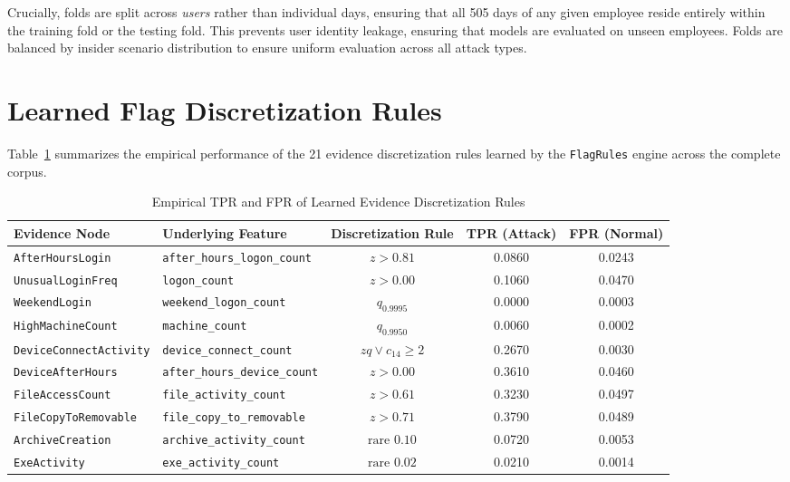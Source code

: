 \documentclass[12pt,a4paper]{report}
\begin{document}
Crucially, folds are split across \textit{users} rather than individual days, ensuring that all 505 days of any given employee reside entirely within the training fold or the testing fold. This prevents user identity leakage, ensuring that models are evaluated on unseen employees. Folds are balanced by insider scenario distribution to ensure uniform evaluation across all attack types.

\section{Learned Flag Discretization Rules}
Table~\ref{tab:results_flag_rules} summarizes the empirical performance of the 21 evidence discretization rules learned by the \texttt{FlagRules} engine across the complete corpus.

\begin{table}[H]
\centering
\caption{Empirical TPR and FPR of Learned Evidence Discretization Rules}
\label{tab:results_flag_rules}
\fontsize{9}{11}\selectfont
\begin{tabular}{llccc}
\toprule
\textbf{Evidence Node} & \textbf{Underlying Feature} & \textbf{Discretization Rule} & \textbf{TPR (Attack)} & \textbf{FPR (Normal)} \\
\midrule
\texttt{AfterHoursLogin} & \texttt{after\_hours\_logon\_count} & $z > 0.81$ & 0.0860 & 0.0243 \\
\texttt{UnusualLoginFreq} & \texttt{logon\_count} & $z > 0.00$ & 0.1060 & 0.0470 \\
\texttt{WeekendLogin} & \texttt{weekend\_logon\_count} & $q_{0.9995}$ & 0.0000 & 0.0003 \\
\texttt{HighMachineCount} & \texttt{machine\_count} & $q_{0.9950}$ & 0.0060 & 0.0002 \\
\texttt{DeviceConnectActivity} & \texttt{device\_connect\_count} & $zq \lor c_{14} \ge 2$ & 0.2670 & 0.0030 \\
\texttt{DeviceAfterHours} & \texttt{after\_hours\_device\_count} & $z > 0.00$ & 0.3610 & 0.0460 \\
\texttt{FileAccessCount} & \texttt{file\_activity\_count} & $z > 0.61$ & 0.3230 & 0.0497 \\
\texttt{FileCopyToRemovable} & \texttt{file\_copy\_to\_removable} & $z > 0.71$ & 0.3790 & 0.0489 \\
\texttt{ArchiveCreation} & \texttt{archive\_activity\_count} & $\text{rare } 0.10$ & 0.0720 & 0.0053 \\
\texttt{ExeActivity} & \texttt{exe\_activity\_count} & $\text{rare } 0.02$ & 0.0210 & 0.0014 \\

\end{tabular}
\end{table}
\end{document}
